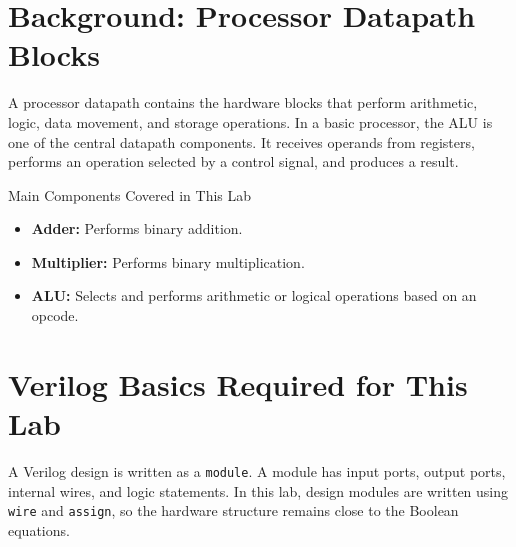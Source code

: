 \documentclass[11pt,a4paper]{article}
\begin{document}
\section{Background: Processor Datapath Blocks}

A processor datapath contains the hardware blocks that perform arithmetic, logic, data movement, and storage operations. In a basic processor, the ALU is one of the central datapath components. It receives operands from registers, performs an operation selected by a control signal, and produces a result.

\begin{center}
\end{center}

\begin{conceptbox}{Main Components Covered in This Lab}
\begin{itemize}[leftmargin=*]
    \item \textbf{Adder:} Performs binary addition.
    \item \textbf{Multiplier:} Performs binary multiplication.
    \item \textbf{ALU:} Selects and performs arithmetic or logical operations based on an opcode.
\end{itemize}
\end{conceptbox}

\section{Verilog Basics Required for This Lab}

A Verilog design is written as a \texttt{module}. A module has input ports, output ports, internal wires, and logic statements. In this lab, design modules are written using \texttt{wire} and \texttt{assign}, so the hardware structure remains close to the Boolean equations.
\end{document}
